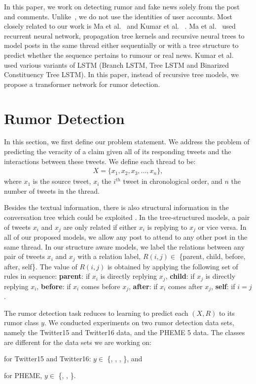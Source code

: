 \documentclass[letterpaper]{article} %
\begin{document}
In this paper, we work on detecting rumor and fake news solely from the post and comments. Unlike~\citet{li-etal-2019-rumor,yang12}, we do not use the identities of user accounts. Most closely related to our work is Ma et al.~ and Kumar et al. ~. Ma et al.~ used recurrent neural network, propagation tree kernels and recursive neural trees to model posts in the same thread either sequentially or with a tree structure to predict whether the sequence pertains to rumour or real news. Kumar et al.~ used various variants of LSTM (Branch LSTM, Tree LSTM and Binarized
Constituency Tree LSTM). In this paper, instead of recursive tree models, we propose a transformer network for rumor detection.

\section{Rumor Detection} \label{motivation_and_analysis}

In this section, we first define our problem statement. We address the problem of predicting the veracity of a claim given all of its responding tweets and the interactions between these tweets. We define each thread to be:
\begin{eqnarray*}
X = \{x_1, x_{2}, x_{3}, ... , x_{n}\},
\end{eqnarray*}
where $x_1$ is the source tweet, $x_{i}$ the $i^{th}$ tweet in chronological order, and $n$ the number of tweets in the thread. 

Besides the textual information, there is also structural information in the conversation tree which could be exploited \cite{ma18,wu15a}. In the tree-structured models, a pair of tweets $x_{i}$ and $x_{j}$ are only related if either $x_{i}$ is replying to $x_{j}$ or vice versa. In all of our proposed models, we allow any post to attend to any other post in the same thread. In our structure aware models, we label the relations between any pair of tweets $x_{i}$ and $x_{j}$ with a relation label, $R(i,j) \in$ \{parent, child, before, after, self\}. The value of $R(i,j)$ is obtained by applying the following set of rules in sequence: 
\textbf{parent}: if $x_{i}$ is directly replying $x_{j}$, \textbf{child}: if $x_{j}$ is directly replying $x_{i}$, \textbf{before}: if $x_{i}$ comes before $x_{j}$, \textbf{after}: if $x_{i}$ comes after $x_{j}$, \textbf{self}: if $i=j$.

The rumor detection task reduces to learning to predict each $(X,R)$ to its rumor class $y$. We conducted experiments on two rumor detection data sets, namely the Twitter15 and Twitter16 data, and the PHEME 5 data. The classes are different for the data sets we are working on:
\begin{itemize*}
\item for Twitter15 and Twitter16: $y\in$ \{\nonrumor{}, \falserumor{}, \truerumor{},  \unverified{}\}, and 
\item for PHEME, $y \in $ \{\falserumor{}, \truerumor{},  \unverified{}\}. 
\end{itemize*}
\end{document}
